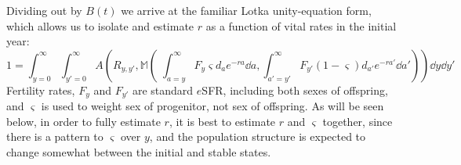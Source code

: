 Dividing out by $B(t)$ we arrive at the familiar Lotka unity-equation form,
which allows us to isolate and estimate $r$ as a function of vital rates in the
initial year:
\begin{equation}
\label{eq:ex2sexCRunity}
1 = \int_{y=0}^\infty \int_{y'=0}^\infty
A\left(R_{y,y'},\mathbb{M}\left(\;\int_{a=y}^\infty F_y \varsigma d_a
e^{-ra} \dd a, \int _{a'=y'}^\infty F_{y'} (1-\varsigma) d_{a'} e^{-ra'} \dd
a'\right)\right) \dd y
\dd y'
\end{equation} 
Fertility rates, $F_y$ and $F_{y'}$ are standard $e$SFR, including both sexes
of offspring, and $\varsigma$ is used to weight sex of
progenitor, not sex of offspring. As will be seen below, in order to fully estimate $r$, it is best
to estimate $r$ and $\varsigma$ together, since there is a pattern to
$\varsigma$ over $y$, and the population structure is expected to change
somewhat between the initial and stable states. 

\FloatBarrier
